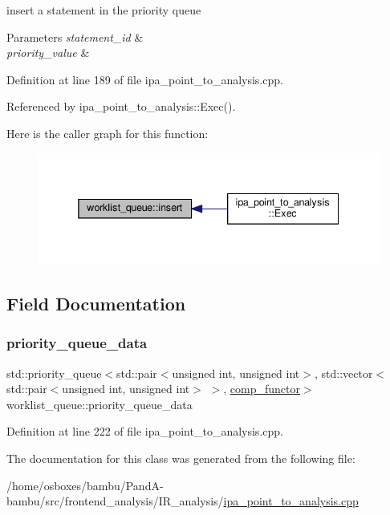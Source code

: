 insert a statement in the priority queue 


\begin{DoxyParams}{Parameters}
{\em statement\+\_\+id} & \\
\hline
{\em priority\+\_\+value} & \\
\hline
\end{DoxyParams}


Definition at line 189 of file ipa\+\_\+point\+\_\+to\+\_\+analysis.\+cpp.



Referenced by ipa\+\_\+point\+\_\+to\+\_\+analysis\+::\+Exec().

Here is the caller graph for this function\+:
\nopagebreak
\begin{figure}[H]
\begin{center}
\leavevmode
\includegraphics[width=338pt]{d0/d23/classworklist__queue_a544824f2c8a6131ddb2fc05d101622a4_icgraph}
\end{center}
\end{figure}


\subsection{Field Documentation}
\mbox{\label{classworklist__queue_abe62bff448ef8018e3069fd27efb4341}} 
\subsubsection{\texorpdfstring{priority\+\_\+queue\+\_\+data}{priority\_queue\_data}}
{\footnotesize\ttfamily std\+::priority\+\_\+queue$<$std\+::pair$<$unsigned int, unsigned int$>$, std\+::vector$<$std\+::pair$<$unsigned int, unsigned int$>$ $>$, \hyperlink{structworklist__queue_1_1comp__functor}{comp\+\_\+functor}$>$ worklist\+\_\+queue\+::priority\+\_\+queue\+\_\+data\hspace{0.3cm}{\ttfamily [private]}}



Definition at line 222 of file ipa\+\_\+point\+\_\+to\+\_\+analysis.\+cpp.



The documentation for this class was generated from the following file\+:\begin{DoxyCompactItemize}
\item 
/home/osboxes/bambu/\+Pand\+A-\/bambu/src/frontend\+\_\+analysis/\+I\+R\+\_\+analysis/\hyperlink{ipa__point__to__analysis_8cpp}{ipa\+\_\+point\+\_\+to\+\_\+analysis.\+cpp}\end{DoxyCompactItemize}
